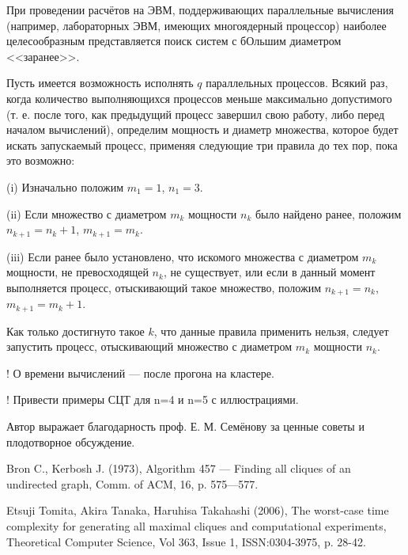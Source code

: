 \documentclass{article}
\begin{document}
При проведении расчётов на ЭВМ, поддерживающих параллельные вычисления (например, лабораторных ЭВМ, имеющих многоядерный процессор) наиболее целесообразным представляется поиск систем с бОльшим диаметром <<заранее>>.

Пусть имеется возможность исполнять $q$ параллельных процессов.
Всякий раз, когда количество выполняющихся процессов меньше максимально допустимого (т. е. после того, как предыдущий процесс завершил свою работу, либо перед началом вычислений), определим мощность и диаметр множества, которое будет искать запускаемый процесс, применяя следующие три правила до тех пор, пока это возможно:

(i)
Изначально положим $m_1=1$, $n_1=3$.

(ii)
Если множество с диаметром $m_k$ мощности $n_k$ было найдено ранее, положим $n_{k+1} = n_k +1$, $m_{k+1} = m_k$.

(iii)
Если ранее было установлено, что искомого множества с диаметром $m_k$ мощности, не превосходящей $n_k$, не существует,
или если в данный момент выполняется процесс, отыскивающий такое множество, положим $n_{k+1} = n_k$, $m_{k+1} = m_k+1$.

Как только достигнуто такое $k$, что данные правила применить нельзя, следует запустить процесс, отыскивающий множество с диаметром $m_k$ мощности $n_k$.




! О времени вычислений --- после прогона на кластере.

! Привести примеры СЦТ для n=4 и n=5 с иллюстрациями.



Автор выражает благодарность проф. Е. М. Семёнову за ценные советы и плодотворное обсуждение.




\newpage

\begin{thebibliography}{99}

 Bron C., Kerbosh J. (1973), Algorithm 457 — Finding all cliques of an undirected graph, Comm. of ACM, 16, p. 575—577.

 Etsuji Tomita, Akira Tanaka, Haruhisa Takahashi (2006), The worst-case time complexity for generating all maximal cliques and computational experiments, Theoretical Computer Science, Vol 363, Issue 1, ISSN:0304-3975, p. 28-42.

\end{thebibliography}
\end{document}
